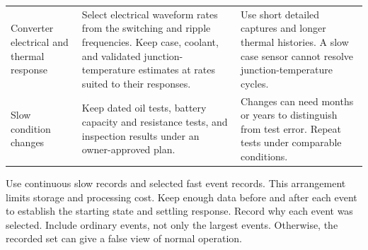 \documentclass[11pt,a4paper]{report}
\begin{document}
\begin{longtable}{L{0.17\textwidth}L{0.36\textwidth}L{0.35\textwidth}}
Converter electrical and thermal response & Select electrical waveform rates from the switching and ripple frequencies. Keep case, coolant, and validated junction-temperature estimates at rates suited to their responses. & Use short detailed captures and longer thermal histories. A slow case sensor cannot resolve junction-temperature cycles. \\
Slow condition changes & Keep dated oil tests, battery capacity and resistance tests, and inspection results under an owner-approved plan. & Changes can need months or years to distinguish from test error. Repeat tests under comparable conditions. \\
\bottomrule
\end{longtable}

Use continuous slow records and selected fast event records.
This arrangement limits storage and processing cost.
Keep enough data before and after each event to establish the starting state and settling response.
Record why each event was selected.
Include ordinary events, not only the largest events.
Otherwise, the recorded set can give a false view of normal operation.
\end{document}
